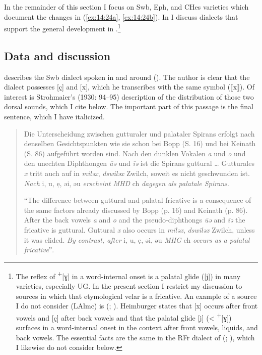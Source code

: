 In the remainder of this section I focus on Swb, Eph, and CHes varieties which document the changes in (\ref{ex:14:24a}, \ref{ex:14:24b}). In  I discuss dialects that support the general development in .\footnote{{The reflex of } \textrm{\textsuperscript{+}}\textrm{[ɣ] in a word-internal onset is a palatal glide ([j]) in many varieties, especially UG. In the present section I restrict my discussion to sources in which that etymological velar is a fricative. An example of a source I do not consider (LAlmc) is  (\citealt{Heimburger1887}; ). Heimburger states that [x] occurs after front vowels and [ç] after back vowels and that the palatal glide [j] (< } \textrm{\textsuperscript{+}}\textrm{[ɣ]) surfaces in a word-internal onset in the context after front vowels, liquids, and back vowels. The essential facts are the same in the RFr dialect of  (\citealt{Lauinger1929}; ), which I likewise do not consider below.}}

\subsection{Data and discussion }\label{sec:14.3.2}

\citet{Strohmaier1930} describes the Swb dialect spoken in and around  (). The author is clear that the dialect possesses [ç] and [x], which he transcribes with the same symbol (⟦x⟧). Of interest is Strohmaier’s (1930: 94--95) description of the distribution of those two dorsal sounds, which I cite below. The important part of this passage is the final sentence, which I have italicized.

\begin{quote}
Die Unterscheidung zwischen gutturaler und palataler Spirans erfolgt nach denselben Gesichtspunkten wie sie schon bei Bopp (S. 16) und bei Keinath (S. 86) aufgeführt worden sind. Nach den dunklen Vokalen \textit{a} und \textit{o} und den unechten Diphthongen \textit{ūə} und \textit{īə} ist die Spirans guttural … Gutturales \textit{x} tritt auch auf in \textit{miləx}, \textit{dswiləx} Zwilch, soweit es nicht geschwunden ist. \textit{Nach} i, u, ẹ, əi, əu \textit{erscheint MHD} ch \textit{dagegen als palatale Spirans}.

“The difference between guttural and palatal fricative is a consequence of the same factors already discussed by Bopp (p. 16) and Keinath (p. 86). After the back vowels \textit{a} and \textit{o} and the pseudo-diphthongs \textit{ūə} and \textit{īə} the fricative is guttural. Guttural \textit{x} also occurs in \textit{miləx}, \textit{dswiləx} Zwilch, unless it was elided. \textit{By contrast, after} i, u, ẹ, əi, əu \textit{MHG} ch \textit{occurs as a palatal fricative}ˮ.
\end{quote}

